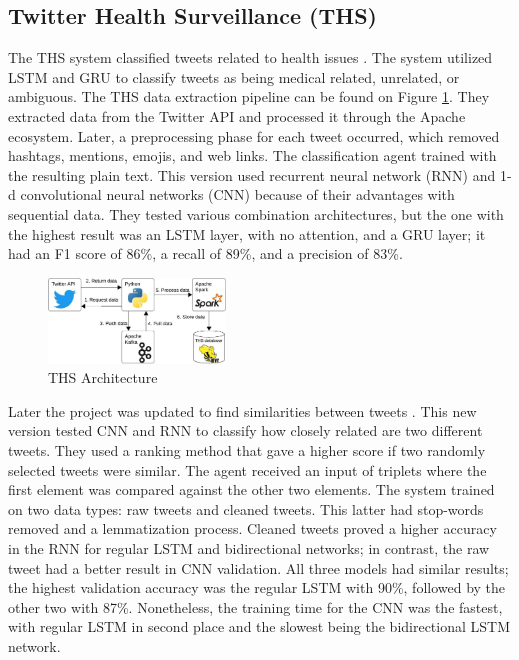 \subsection{Twitter Health Surveillance (THS)}
The THS system classified tweets related to health issues \cite{8622504}. The system utilized LSTM and GRU to classify tweets as being medical related, unrelated, or ambiguous.  The THS
data extraction pipeline can be found on Figure \ref{ths_architecture}. They extracted data from the Twitter API and processed it through the Apache ecosystem. Later, a preprocessing phase
for each tweet occurred, which removed hashtags, mentions, emojis, and web links. The classification agent trained with the resulting plain text. This version used recurrent neural network (RNN) and
1-d convolutional neural networks (CNN) because of their advantages with sequential data. They tested various combination architectures, but the one with the highest result was an LSTM layer, with no attention,
and a GRU layer; it had an F1 score of 86\%, a recall of 89\%, and a precision of 83\%.  
 
  \begin{figure}[!h]
    \centering
        \includegraphics[width=0.42\textwidth]{figures/ths_architecture.jpeg}
        \caption{THS Architecture}
        \label{ths_architecture}
\end{figure}

Later the project was updated to find similarities between tweets \cite{9581175}. This new version tested CNN and RNN to classify how closely related are two different tweets.
They used a ranking method that gave a higher score if two randomly selected tweets were similar. The agent received an input of triplets where the first element was compared against the other two elements.
The system trained on two data types: raw tweets and cleaned tweets. This latter had stop-words removed and a lemmatization process. Cleaned tweets proved a higher accuracy in the RNN
for regular LSTM and bidirectional networks; in contrast, the raw tweet had a better result in CNN validation. All three models had similar results; the highest validation accuracy was the regular LSTM with 90\%,
followed by the other two with 87\%. Nonetheless, the training time for the CNN was the fastest, with regular LSTM in second place and the slowest being the bidirectional LSTM network. 

